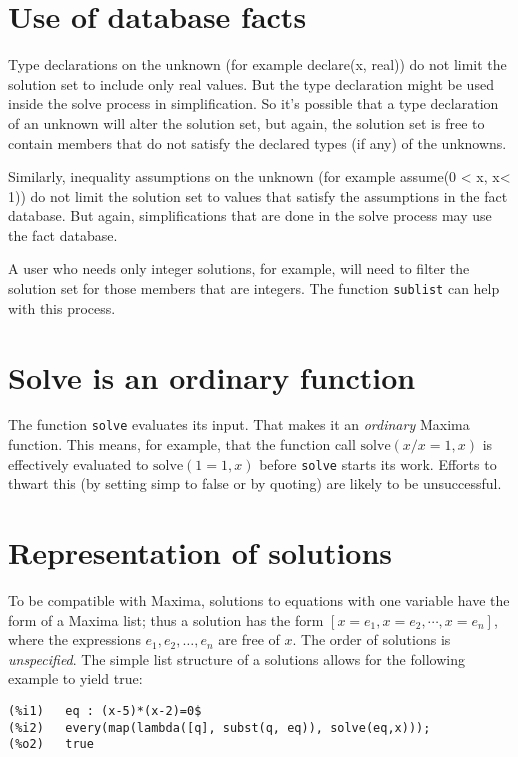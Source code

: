 \documentclass[]{article}%
\newcommand{\solve}{\texttt{solve}}
\begin{document}
\section{Use of database facts}

Type declarations on the unknown (for example declare(x, real)) do not limit the solution set to include
only real values. But the type declaration might be used inside the solve process in simplification. So
it's possible that a type declaration of an unknown will alter the solution set, but again, the solution
set is free to contain members that do not satisfy the declared types (if any) of the unknowns.

Similarly, inequality assumptions on the unknown (for example assume(0 < x, x< 1)) do not limit the solution
set to values that satisfy the assumptions in the fact database. But again, simplifications that are done
in the solve process may use the fact database.

A user who needs only integer solutions, for example, will need to filter the solution set for those members that are integers. The function \texttt{sublist} can help with this process.

\section{Solve is an ordinary function}

The function \solve \/ evaluates its input. That makes it an \emph{ordinary} Maxima function. This means, for example, that the function call \(\mathrm{solve}(x/x=1,x)\) is effectively evaluated to \(\mathrm{solve}(1=1,x)\) before \solve \/ starts its work. Efforts to thwart this (by setting simp to false or by quoting) are likely to be unsuccessful.

\section{Representation of solutions}

To be compatible with Maxima, solutions to equations with one variable have the form of a Maxima list; thus a solution has the form \([x = e_1, x = e_2, \cdots, x = e_n]\), where the expressions \(e_1, e_2, \dots, e_n\) are free of \(x\). The order of solutions is \emph{unspecified}. The simple list structure of a solutions allows for the following example to yield true:

\begin{verbatim}
(%i1)	eq : (x-5)*(x-2)=0$
(%i2)	every(map(lambda([q], subst(q, eq)), solve(eq,x)));
(%o2)	true
\end{verbatim}
\end{document}
